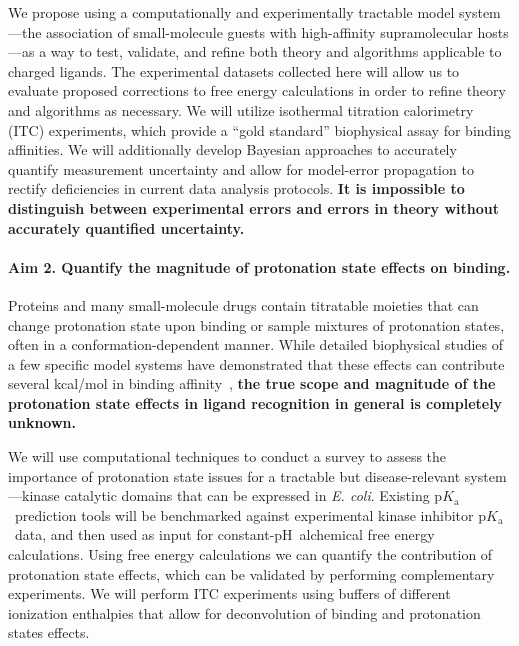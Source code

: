 \documentclass[10pt,final]{article}
\newcommand{\pKa}{p$K_\mathrm{a}$\ }
\newcommand{\pH}{p$\mathrm{H}$\ }
\begin{document}
We propose using a computationally and experimentally tractable model system---the association of small-molecule guests with high-affinity supramolecular hosts---as a way to test, validate, and refine both theory and algorithms applicable to charged ligands.
%
The experimental datasets collected here will allow us to evaluate proposed corrections to free energy calculations in order to refine theory and algorithms as necessary.
%
We will utilize isothermal titration calorimetry (ITC) experiments, which provide a “gold standard” biophysical assay for binding affinities.
%
We will additionally develop Bayesian approaches to accurately quantify measurement uncertainty and allow for model-error propagation to rectify deficiencies in current data analysis protocols.
%
\textbf{It is impossible to distinguish between experimental errors and errors in theory without accurately quantified uncertainty.
}

\paragraph*{Aim 2. Quantify the magnitude of protonation state effects on binding.}
Proteins and many small-molecule drugs contain titratable moieties that can change protonation state upon binding or sample mixtures of protonation states, often in a conformation-dependent manner.
%
While detailed biophysical studies of a few specific model systems have demonstrated that these effects can contribute several kcal/mol in binding affinity~\autocite{Dullweber2001a,Aleksandrov2007a,Czodrowski2007a,Steuber2007a,Czodrowski2007b}, \textbf{the true scope and magnitude of the protonation state effects in ligand recognition in general is completely unknown.}

We will use computational techniques to conduct a survey to assess the importance of protonation state issues for a tractable but disease-relevant system---kinase catalytic domains that can be expressed in \textit{E. coli}.
%
Existing \pKa prediction tools will be benchmarked against experimental kinase inhibitor \pKa data, and then used as input for constant-\pH alchemical free energy calculations.
%
Using free energy calculations we can quantify the contribution of protonation state effects, which can be validated by performing complementary experiments.
%
We will perform ITC experiments using buffers of different ionization enthalpies that allow for deconvolution of binding and protonation states effects.
\end{document}
